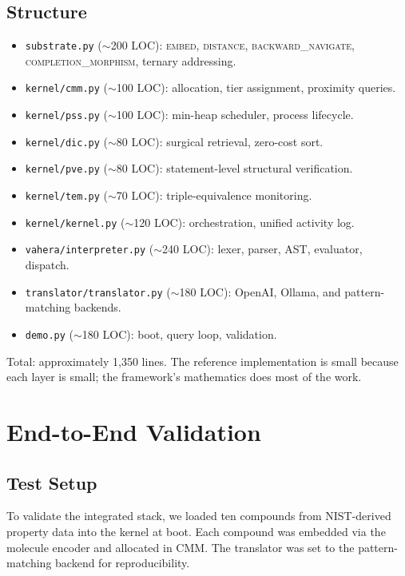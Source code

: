 \documentclass[11pt,twocolumn,a4paper]{article}
\begin{document}
\subsection{Structure}

\begin{itemize}[leftmargin=*]
\item \texttt{substrate.py} ($\sim$200 LOC): \textsc{embed}, \textsc{distance}, \textsc{backward\_navigate}, \textsc{completion\_morphism}, ternary addressing.
\item \texttt{kernel/cmm.py} ($\sim$100 LOC): allocation, tier assignment, proximity queries.
\item \texttt{kernel/pss.py} ($\sim$100 LOC): min-heap scheduler, process lifecycle.
\item \texttt{kernel/dic.py} ($\sim$80 LOC): surgical retrieval, zero-cost sort.
\item \texttt{kernel/pve.py} ($\sim$80 LOC): statement-level structural verification.
\item \texttt{kernel/tem.py} ($\sim$70 LOC): triple-equivalence monitoring.
\item \texttt{kernel/kernel.py} ($\sim$120 LOC): orchestration, unified activity log.
\item \texttt{vahera/interpreter.py} ($\sim$240 LOC): lexer, parser, AST, evaluator, dispatch.
\item \texttt{translator/translator.py} ($\sim$180 LOC): OpenAI, Ollama, and pattern-matching backends.
\item \texttt{demo.py} ($\sim$180 LOC): boot, query loop, validation.
\end{itemize}

Total: approximately 1,350 lines. The reference implementation is small because each layer is small; the framework's mathematics does most of the work.


\section{End-to-End Validation}
\label{sec:validation}

\subsection{Test Setup}

To validate the integrated stack, we loaded ten compounds from NIST-derived property data into the kernel at boot. Each compound was embedded via the molecule encoder and allocated in CMM. The translator was set to the pattern-matching backend for reproducibility.
\end{document}
